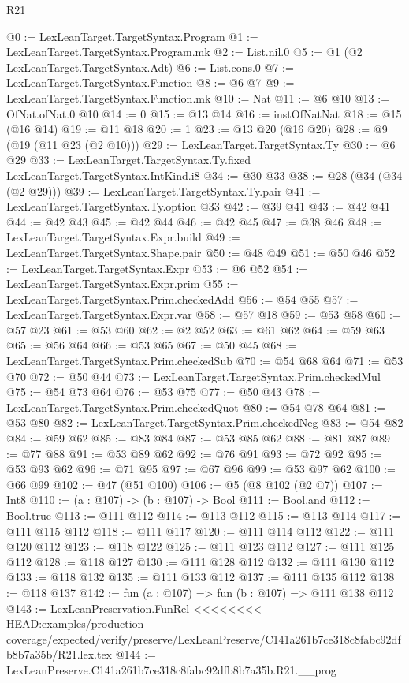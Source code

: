\begin{lexlean}{R21}
\begin{coremodule}
{{{{{@0 := LexLeanTarget.TargetSyntax.Program
@1 := LexLeanTarget.TargetSyntax.Program.mk
@2 := List.nil.{0}
@5 := @1 (@2 LexLeanTarget.TargetSyntax.Adt)
@6 := List.cons.{0}
@7 := LexLeanTarget.TargetSyntax.Function
@8 := @6 @7
@9 := LexLeanTarget.TargetSyntax.Function.mk
@10 := Nat
@11 := @6 @10
@13 := OfNat.ofNat.{0} @10
@14 := 0
@15 := @13 @14
@16 := instOfNatNat
@18 := @15 (@16 @14)
@19 := @11 @18
@20 := 1
@23 := @13 @20 (@16 @20)
@28 := @9 (@19 (@11 @23 (@2 @10)))
@29 := LexLeanTarget.TargetSyntax.Ty
@30 := @6 @29
@33 := LexLeanTarget.TargetSyntax.Ty.fixed LexLeanTarget.TargetSyntax.IntKind.i8
@34 := @30 @33
@38 := @28 (@34 (@34 (@2 @29)))
@39 := LexLeanTarget.TargetSyntax.Ty.pair
@41 := LexLeanTarget.TargetSyntax.Ty.option @33
@42 := @39 @41
@43 := @42 @41
@44 := @42 @43
@45 := @42 @44
@46 := @42 @45
@47 := @38 @46
@48 := LexLeanTarget.TargetSyntax.Expr.build
@49 := LexLeanTarget.TargetSyntax.Shape.pair
@50 := @48 @49
@51 := @50 @46
@52 := LexLeanTarget.TargetSyntax.Expr
@53 := @6 @52
@54 := LexLeanTarget.TargetSyntax.Expr.prim
@55 := LexLeanTarget.TargetSyntax.Prim.checkedAdd
@56 := @54 @55
@57 := LexLeanTarget.TargetSyntax.Expr.var
@58 := @57 @18
@59 := @53 @58
@60 := @57 @23
@61 := @53 @60
@62 := @2 @52
@63 := @61 @62
@64 := @59 @63
@65 := @56 @64
@66 := @53 @65
@67 := @50 @45
@68 := LexLeanTarget.TargetSyntax.Prim.checkedSub
@70 := @54 @68 @64
@71 := @53 @70
@72 := @50 @44
@73 := LexLeanTarget.TargetSyntax.Prim.checkedMul
@75 := @54 @73 @64
@76 := @53 @75
@77 := @50 @43
@78 := LexLeanTarget.TargetSyntax.Prim.checkedQuot
@80 := @54 @78 @64
@81 := @53 @80
@82 := LexLeanTarget.TargetSyntax.Prim.checkedNeg
@83 := @54 @82
@84 := @59 @62
@85 := @83 @84
@87 := @53 @85 @62
@88 := @81 @87
@89 := @77 @88
@91 := @53 @89 @62
@92 := @76 @91
@93 := @72 @92
@95 := @53 @93 @62
@96 := @71 @95
@97 := @67 @96
@99 := @53 @97 @62
@100 := @66 @99
@102 := @47 (@51 @100)
@106 := @5 (@8 @102 (@2 @7))
@107 := Int8
@110 := (a : @107) -> (b : @107) -> Bool
@111 := Bool.and
@112 := Bool.true
@113 := @111 @112
@114 := @113 @112
@115 := @113 @114
@117 := @111 @115 @112
@118 := @111 @117
@120 := @111 @114 @112
@122 := @111 @120 @112
@123 := @118 @122
@125 := @111 @123 @112
@127 := @111 @125 @112
@128 := @118 @127
@130 := @111 @128 @112
@132 := @111 @130 @112
@133 := @118 @132
@135 := @111 @133 @112
@137 := @111 @135 @112
@138 := @118 @137
@142 := fun (a : @107) => fun (b : @107) => @111 @138 @112
@143 := LexLeanPreservation.FunRel
<<<<<<<< HEAD:examples/production-coverage/expected/verify/preserve/LexLeanPreserve/C141a261b7ce318c8fabc92dfb8b7a35b/R21.lex.tex
@144 := LexLeanPreserve.C141a261b7ce318c8fabc92dfb8b7a35b.R21.__prog
}}}}}
\end{coremodule}
\end{lexlean}
